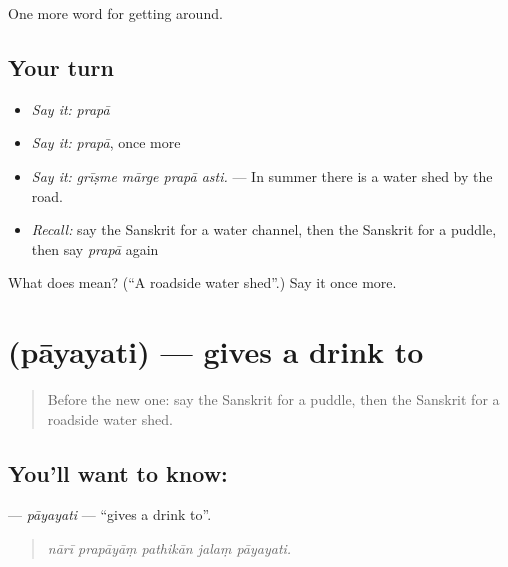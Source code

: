 \begin{grammarlens}[title={What you've built}]
One more word for getting around.
\end{grammarlens}

\subsection*{Your turn}
\begin{itemize}
\raggedright
  \item \emph{Say it:} \emph{prapā}
  \item \emph{Say it:} \emph{prapā}, once more
  \item \emph{Say it:} \emph{grīṣme mārge prapā asti.} — In summer there is a water shed by the road.
  \item \emph{Recall:} say the Sanskrit for a water channel, then the Sanskrit for a puddle, then say \emph{prapā} again
\end{itemize}

\begin{tcolorbox}[breakable,colback=teal!4,colframe=teal!35!black,title={Before you move on}]
What does  mean? (\textquotedblleft{}A roadside water shed\textquotedblright{}.) Say it once more.
\end{tcolorbox}
\section[\texorpdfstring{\sk{पाययति} (pāyayati)}{पाययति (pāyayati)}]{ (pāyayati) — gives a drink to}

\label{lesson:SA-C420-payayati}



\begin{quote}
Before the new one: say the Sanskrit for a puddle, then the Sanskrit for a roadside water shed.
\end{quote}

\subsection*{You'll want to know: }
\textbf{} — \emph{pāyayati} — \textquotedblleft{}gives a drink to\textquotedblright{}.

\begin{quote}
    
\end{quote}

\begin{quote}
\emph{nārī prapāyāṃ pathikān jalaṃ pāyayati.}
\end{quote}

